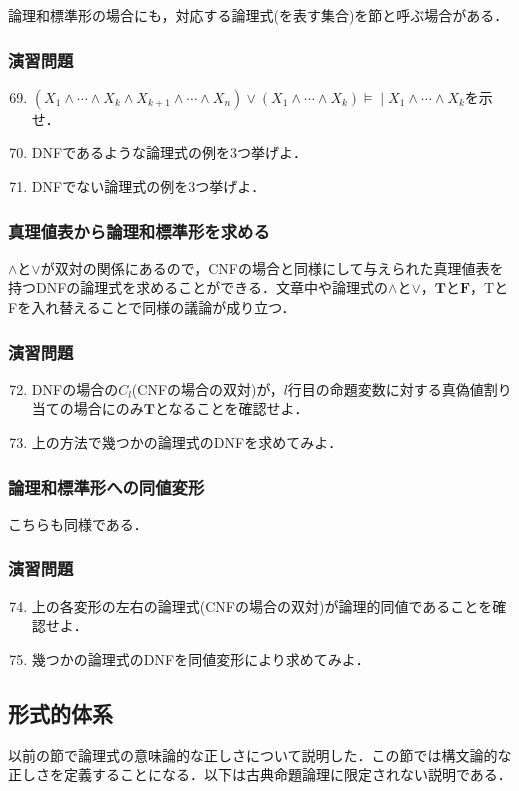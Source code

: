 \documentclass{ltjsarticle}
\theoremstyle{mystyle1}
\theoremstyle{mystyle3}
\theoremstyle{mystyle2}
\newcommand{\bT}{\ensuremath{\mathbf{T}}}
\newcommand{\bF}{\ensuremath{\mathbf{F}}}
\newcommand{\lequiv}{\ensuremath{\models\!\mid}}
\begin{document}
論理和標準形の場合にも，対応する論理式(を表す集合)を節と呼ぶ場合がある．
\subsubsection*{演習問題}
\begin{enumerate}
  \setcounter{enumi}{68}
  \item $(X_1\wedge\cdots\wedge X_k\wedge X_{k+1}\wedge\cdots\wedge X_n)\vee(X_1\wedge\cdots\wedge X_k)\lequiv X_1\wedge\cdots\wedge X_k$を示せ．
  \item DNFであるような論理式の例を3つ挙げよ．
  \item DNFでない論理式の例を3つ挙げよ．
\end{enumerate}
\subsubsection{真理値表から論理和標準形を求める}
$\wedge$と$\vee$が双対の関係にあるので，CNFの場合と同様にして与えられた真理値表を持つDNFの論理式を求めることができる．文章中や論理式の$\wedge$と$\vee$，$\bT$と$\bF$，TとFを入れ替えることで同様の議論が成り立つ．
\subsubsection*{演習問題}
\begin{enumerate}
  \setcounter{enumi}{71}
  \item DNFの場合の$C_l$(CNFの場合の双対)が，$l$行目の命題変数に対する真偽値割り当ての場合にのみ$\bT$となることを確認せよ．
  \item 上の方法で幾つかの論理式のDNFを求めてみよ．
\end{enumerate}
\subsubsection{論理和標準形への同値変形}
こちらも同様である．
\subsubsection*{演習問題}
\begin{enumerate}
  \setcounter{enumi}{73}
  \item 上の各変形の左右の論理式(CNFの場合の双対)が論理的同値であることを確認せよ．
  \item 幾つかの論理式のDNFを同値変形により求めてみよ．
\end{enumerate}

\subsection{形式的体系}
以前の節で論理式の意味論的な正しさについて説明した．この節では構文論的な正しさを定義することになる．以下は古典命題論理に限定されない説明である．
\end{document}
